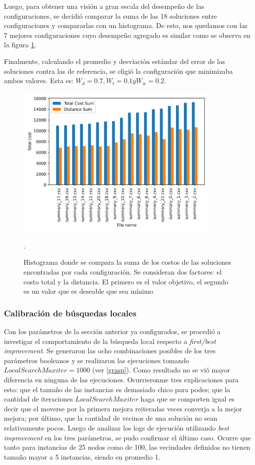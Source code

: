 \documentclass{article}
\begin{document}
  Luego, para obtener una visión a gran escala del desempeño de las configuraciones, se decidió comparar la suma de las 18 soluciones entre configuraciones y compararlas con un histograma. De esto, nos quedamos con las 7 mejores configuraciones cuyo desempeño agregado es similar como se observa en la figura \ref{cmphistogram}.

  Finalmente, calculando el promedio y desviación estándar del error de las soluciones contra las de referencia, se eligió la configuración que minimizaba ambos valores. Esta es: $W_d = 0.7, W_t = 0.1 y W_w = 0.2$.

  \begin{figure}
    \centering
    \includegraphics[width=10cm]{resources/tunning/total_cost_histogram_used.png}
    \caption{Histograma donde se compara la suma de los costos de las soluciones encontradas por cada configuración. Se consideran dos factores: el costo total y la distancia. El primero es el valor objetivo, el segundo es un valor que es deseable que sea mínimo}.
    \label{cmphistogram}
  \end{figure}

  \subsubsection*{Calibración de búsquedas locales}

  Con los parámetros de la sección anterior ya configurados, se procedió a investigar el comportamiento de la búsqueda local respecto a {\it first/best improvement}. Se generaron las ocho combinaciones posibles de los tres parámetros booleanos y se realizaron las ejecuciones tomando $LocalSearchMaxiter = 1000$ (ver \ref{grasp}). Como resultado no se vió mayor diferencia en ninguna de las ejecuciones. Ocurrieronme tres explicaciones para esto: que el tamaño de las instancias es demasiado chico para podes; que la cantidad de iteraciones $LocalSearchMaxiter$ haga que se comporten igual es decir que el moverse por la primera mejora reiteradas veces converja a la mejor mejora; por último, que la cantidad de vecinos de una solución no sean relativamente pocos. Luego de analizar los logs de ejecución utilizando {\it best improvement} en los tres parámetros, se pudo confirmar el último caso. Ocurre que tanto para instancias de 25 nodos como de 100, las vecindades definidas no tienen tamaño mayor a 5 instancias, siendo en promedio 1.
  
\end{document}
